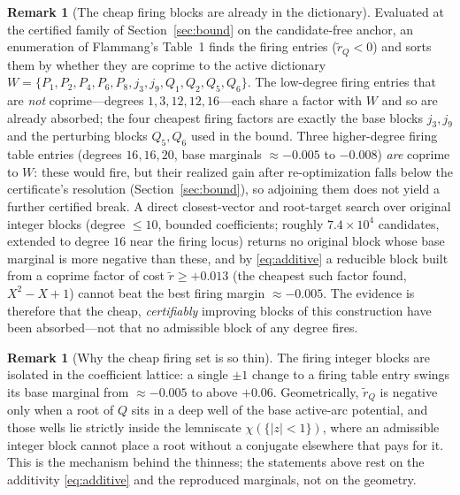 \documentclass[11pt,reqno]{amsart}
\theoremstyle{plain}
\theoremstyle{definition}
\newtheorem{remark}[theorem]{Remark}
\begin{document}
\begin{remark}[The cheap firing blocks are already in the dictionary]\label{rem:evidence}
Evaluated at the certified family of Section~\ref{sec:bound} on the candidate-free
anchor, an enumeration of Flammang's \citep{F18} Table~1 finds the firing entries
($\widetilde r_Q<0$) and sorts them by whether they are coprime to the active
dictionary $W=\{P_1,P_2,P_4,P_6,P_8,j_3,j_9,Q_1,Q_2,Q_5,Q_6\}$. The low-degree firing
entries that are \emph{not} coprime---degrees $1,3,12,12,16$---each share a factor with
$W$ and so are already absorbed; the four cheapest firing factors are exactly the base
blocks $j_3,j_9$ and the perturbing blocks $Q_5,Q_6$ used in the bound. Three
higher-degree firing table entries (degrees $16,16,20$, base marginals $\approx-0.005$
to $-0.008$) \emph{are} coprime to $W$: these would fire, but their realized gain after
re-optimization falls below the certificate's resolution (Section~\ref{sec:bound}), so
adjoining them does not yield a further certified break. A direct closest-vector and
root-target search over original integer blocks (degree $\le10$, bounded coefficients;
roughly $7.4\times10^4$ candidates, extended to degree $16$ near the firing locus)
returns no original block whose base marginal is more negative than these, and by
\eqref{eq:additive} a reducible block built from a coprime factor of cost
$\widetilde r\ge+0.013$ (the cheapest such factor found, $X^2-X+1$) cannot beat the
best firing margin $\approx-0.005$. The evidence is therefore that the cheap,
\emph{certifiably} improving blocks of this construction have been absorbed---not that
no admissible block of any degree fires.
\end{remark}

\begin{remark}[Why the cheap firing set is so thin]\label{rem:wells}
The firing integer blocks are isolated in the coefficient lattice: a single $\pm1$
change to a firing table entry swings its base marginal from $\approx-0.005$ to above
$+0.06$. Geometrically, $\widetilde r_Q$ is negative only when a root of $Q$ sits in a
deep well of the base active-arc potential, and those wells lie strictly inside the
lemniscate $\chi(\{|z|<1\})$, where an admissible integer block cannot place a root
without a conjugate elsewhere that pays for it. This is the mechanism behind the
thinness; the statements above rest on the additivity \eqref{eq:additive} and the
reproduced marginals, not on the geometry.
\end{remark}
\end{document}
